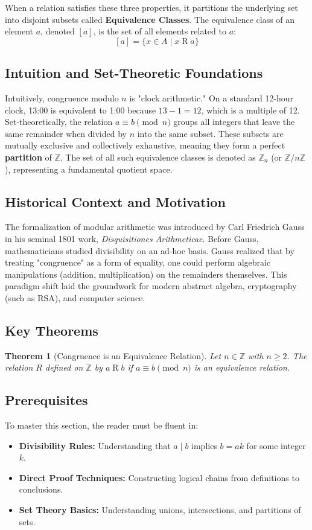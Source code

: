 \documentclass[11pt, a4paper]{article}
\newtheorem{theorem}{Theorem}[section]
\theoremstyle{definition}
\theoremstyle{remark}
\begin{document}
When a relation satisfies these three properties, it partitions the underlying set into disjoint subsets called \textbf{Equivalence Classes}. The equivalence class of an element $a$, denoted $[a]$, is the set of all elements related to $a$:
\[ \displaystyle [a] = \{ x \in A \mid x \mathrel{R} a \} \]

\subsection{Intuition and Set-Theoretic Foundations}
Intuitively, congruence modulo $n$ is "clock arithmetic." On a standard 12-hour clock, 13:00 is equivalent to 1:00 because $13 - 1 = 12$, which is a multiple of 12. Set-theoretically, the relation $a \equiv b \pmod{n}$ groups all integers that leave the same remainder when divided by $n$ into the same subset. These subsets are mutually exclusive and collectively exhaustive, meaning they form a perfect \textbf{partition} of $\mathbb{Z}$. The set of all such equivalence classes is denoted as $\mathbb{Z}_n$ (or $\mathbb{Z}/n\mathbb{Z}$), representing a fundamental quotient space.

\subsection{Historical Context and Motivation}
The formalization of modular arithmetic was introduced by Carl Friedrich Gauss in his seminal 1801 work, \textit{Disquisitiones Arithmeticae}. Before Gauss, mathematicians studied divisibility on an ad-hoc basis. Gauss realized that by treating "congruence" as a form of equality, one could perform algebraic manipulations (addition, multiplication) on the remainders themselves. This paradigm shift laid the groundwork for modern abstract algebra, cryptography (such as RSA), and computer science.

\subsection{Key Theorems}
\begin{theorem}[Congruence is an Equivalence Relation]
Let $n \in \mathbb{Z}$ with $n \geq 2$. The relation $R$ defined on $\mathbb{Z}$ by $a \mathrel{R} b$ if $a \equiv b \pmod{n}$ is an equivalence relation.
\end{theorem}

\subsection{Prerequisites}
To master this section, the reader must be fluent in:
\begin{itemize}
    \item \textbf{Divisibility Rules:} Understanding that $a \mid b$ implies $b = ak$ for some integer $k$.
    \item \textbf{Direct Proof Techniques:} Constructing logical chains from definitions to conclusions.
    \item \textbf{Set Theory Basics:} Understanding unions, intersections, and partitions of sets.
\end{itemize}
\end{document}
